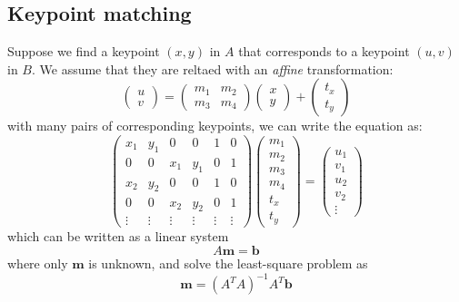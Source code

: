 \documentclass[twocolumn,landscape,10pt]{article}
\theoremstyle{definition}
\begin{document}
\subsection{Keypoint matching}

Suppose we find a keypoint $(x,y)$ in $A$ that corresponds to a keypoint $(u,v)$
in $B$. We assume that they are reltaed with an \emph{affine} transformation:
\[
    \begin{pmatrix}
        u \\
        v
    \end{pmatrix} 
    =
    \begin{pmatrix}
        m_1 & m_2 \\
        m_3 & m_4
    \end{pmatrix} 
    \begin{pmatrix}
        x \\
        y
    \end{pmatrix} 
    +
    \begin{pmatrix}
        t_x \\
        t_y
    \end{pmatrix} 
\]
with many pairs of corresponding keypoints, we can write the equation as:
\[
    \begin{pmatrix}
        x_1 & y_1 & 0 & 0 & 1 & 0 \\
        0 & 0 & x_1 & y_1 & 0 & 1 \\
        x_2 & y_2 & 0 & 0 & 1 & 0 \\
        0 & 0 & x_2 & y_2 & 0 & 1 \\
        \vdots & \vdots & \vdots & \vdots & \vdots & \vdots
    \end{pmatrix} 
    \begin{pmatrix}
        m_1 \\
        m_2 \\
        m_3 \\
        m_4 \\
        t_x \\
        t_y
    \end{pmatrix} 
    =
    \begin{pmatrix}
        u_1 \\
        v_1 \\
        u_2 \\
        v_2 \\
        \vdots
    \end{pmatrix} 
\]
which can be written as a linear system
\[
    A\mathbf{m}=\mathbf{b}
\]where only $\mathbf{m}$ is unknown, and solve the least-square problem as
\[
    \mathbf{m}={(A^TA)}^{-1}A^T\mathbf{b}
\]
\end{document}
